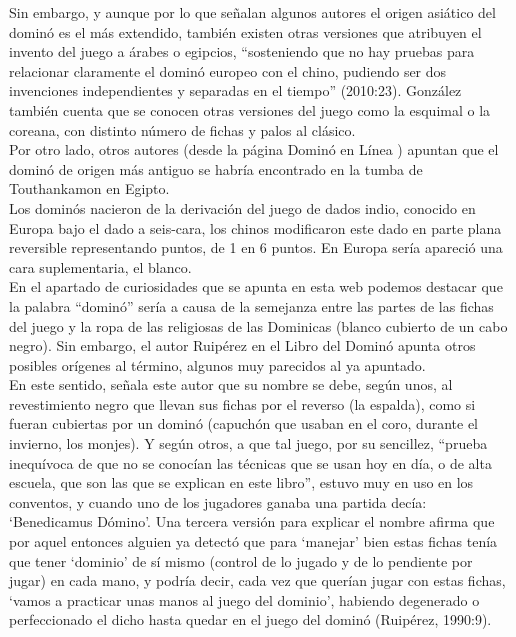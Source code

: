 Sin embargo, y aunque por lo que señalan algunos autores el origen asiático del dominó es el más
extendido, también existen otras versiones que atribuyen el invento del juego a árabes o egipcios,
“sosteniendo que no hay pruebas para relacionar claramente el dominó europeo con el chino, pudiendo
ser dos invenciones independientes y separadas en el tiempo” (2010:23). González también cuenta que
se conocen otras versiones del juego como la esquimal o la coreana, con distinto número de fichas
y palos al clásico. \\

Por otro lado, otros autores (desde la página Dominó en Línea \cite{website:dominoenlinea}) apuntan que el dominó
de origen más antiguo se habría encontrado en la tumba de Touthankamon en Egipto. \\

Los dominós nacieron de la derivación del juego de dados indio, conocido en Europa bajo el dado a
seis-cara, los chinos modificaron este dado en parte plana reversible representando puntos, de 1
en 6 puntos. En Europa sería apareció una cara suplementaria, el blanco. \\

En el apartado de curiosidades que se apunta en esta web podemos destacar que la palabra “dominó”
sería a causa de la semejanza entre las partes de las fichas del juego y la ropa de las religiosas
de las Dominicas (blanco cubierto de un cabo negro). Sin embargo, el autor Ruipérez en el Libro
del Dominó apunta otros posibles orígenes al término, algunos muy parecidos al ya apuntado. \\

En este sentido, señala este autor que su nombre se debe, según unos, al revestimiento negro que
llevan sus fichas por el reverso (la espalda), como si fueran cubiertas por un dominó (capuchón
que usaban en el coro, durante el invierno, los monjes). Y según otros, a que tal juego, por su
sencillez, “prueba inequívoca de que no se conocían las técnicas que se usan hoy en día, o de alta
escuela, que son las que se explican en este libro”, estuvo muy en uso en los conventos, y cuando
uno de los jugadores ganaba una partida decía: ‘Benedicamus Dómino’. Una tercera versión para
explicar el nombre afirma que por aquel entonces alguien ya detectó que para ‘manejar’ bien estas
fichas tenía que tener ‘dominio’ de sí mismo (control de lo jugado y de lo pendiente por jugar) en
cada mano, y podría decir, cada vez que querían jugar con estas fichas, ‘vamos a practicar unas
manos al juego del dominio’, habiendo degenerado o perfeccionado el dicho hasta quedar en el juego
del dominó (Ruipérez, 1990:9). \\

